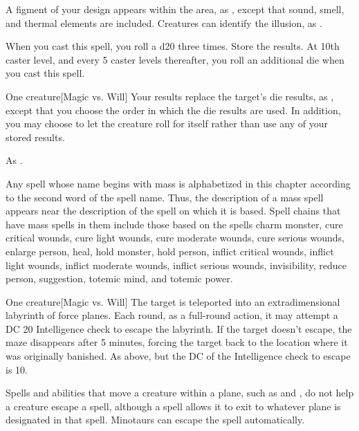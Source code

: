 \spelldur{\durshort}
\spellline
\spelleffect A figment of your design appears within the area, as , except that sound, smell, and thermal elements are included.
\spellnotes Creatures can identify the illusion, as .

\spellrng{\rngmed}
\spellspecial When you cast this spell, you roll a d20 three times. Store the results. At 10th caster level, and every 5 caster levels thereafter, you roll an additional die when you cast this spell.
\begin{spelltarget}{One creature}[Magic vs. Will]
    \spellsuccess Your results replace the target's die results, as , except that you choose the order in which the die results are used. In addition, you may choose to let the creature roll for itself rather than use any of your stored results.
\end{spelltarget}
\spellnotes As .

\par Any spell whose name begins with mass is alphabetized in this chapter according to the second word of the spell name. Thus, the description of a mass spell appears near the description of the spell on which it is based. Spell chains that have mass spells in them include those based on the spells charm monster, cure critical wounds, cure light wounds, cure moderate wounds, cure serious wounds, enlarge person, heal, hold monster, hold person, inflict critical wounds, inflict light wounds, inflict moderate wounds, inflict serious wounds, invisibility, reduce person, suggestion, totemic mind, and totemic power.

\spellrng{\rngmed}
\begin{spelltarget}{One creature}[Magic vs. Will]
    \spellsuccess The target is teleported into an extradimensional labyrinth of force planes. Each round, as a full-round action, it may attempt a DC 20 Intelligence check to escape the labyrinth. If the target doesn't escape, the maze disappears after 5 minutes, forcing the target back to the location where it was originally banished.
    \spellfailure As above, but the DC of the Intelligence check to escape is 10.
\end{spelltarget}
\spellnotes Spells and abilities that move a creature within a plane, such as  and , do not help a creature escape a  spell, although a  spell allows it to exit to whatever plane is designated in that spell. Minotaurs can escape the spell automatically.


